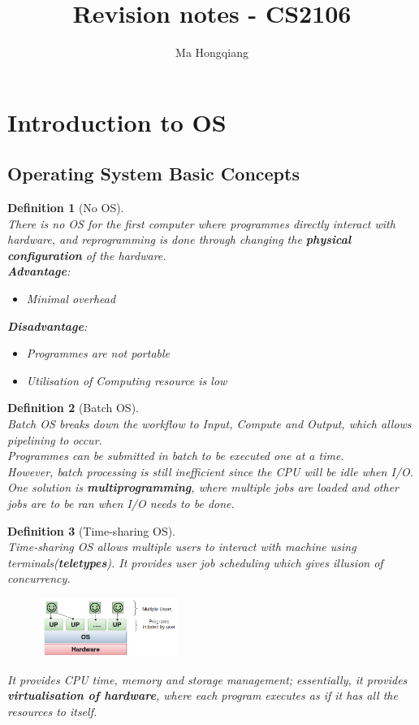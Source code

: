 \documentclass[12pt]{article}
\newtheorem{definition}{Definition}[section]
\theoremstyle{definition}
\begin{document}
\title{Revision notes - CS2106}
\author{Ma Hongqiang}
\maketitle
\tableofcontents


\twocolumn
\section{Introduction to OS}
\subsection{Operating System Basic Concepts}
\begin{definition}[No OS]
\hfill\\\normalfont There is no OS for the first computer where programmes \textit{directly} interact with hardware, and reprogramming is done through changing the \textbf{physical configuration} of the hardware.\\
\textbf{Advantage}:
\begin{itemize}
  \item Minimal overhead
\end{itemize}
\textbf{Disadvantage}:
\begin{itemize}
  \item Programmes are not portable
  \item Utilisation of Computing resource is low
\end{itemize}
\end{definition}
\begin{definition}[Batch OS]
\hfill\\\normalfont Batch OS breaks down the workflow to Input, Compute and Output, which allows pipelining to occur.\\
Programmes can be \textit{submitted in batch} to be \textit{executed one at a time}. \\
However, batch processing is still inefficient since the CPU will be idle when I/O. One solution is \textbf{multiprogramming}, where multiple jobs are loaded and other jobs are to be ran when I/O needs to be done.
\end{definition}
\begin{definition}[Time-sharing OS]
\hfill\\\normalfont Time-sharing OS allows multiple users to interact with machine using terminals(\textbf{teletypes}). It provides user job scheduling which gives \textit{illusion} of concurrency. \\
\begin{figure}[h]
\centering
\includegraphics[width = 0.4\textwidth]{1_3.png}
\end{figure}
It provides CPU time, memory and storage management; essentially, it provides \textbf{virtualisation of hardware}, where each program executes as if it has all the resources to itself.
\end{definition}
\end{document}
